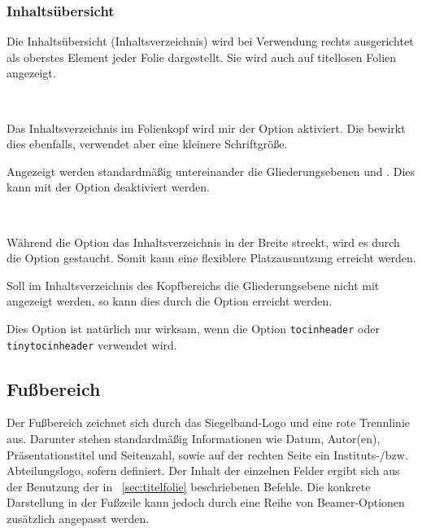 \subsubsection{Inhaltsübersicht}

Die Inhaltsübersicht (Inhaltsverzeichnis) wird bei Verwendung rechts
ausgerichtet als oberstes Element jeder Folie dargestellt.
Sie wird auch auf titellosen Folien angezeigt.


\begin{Declaration}
  \\
\end{Declaration}

Das Inhaltsverzeichnis im Folienkopf
wird mir der Option  aktiviert.
Die  bewirkt dies ebenfalls,
verwendet aber eine kleinere Schriftgröße.

Angezeigt werden standardmäßig untereinander die Gliederungsebenen
 und . Dies kann mit der Option
 deaktiviert werden.


\begin{Declaration}
  \\
\end{Declaration}

Während die Option  das Inhaltsverzeichnis in der Breite
streckt, wird es durch die Option  gestaucht.
Somit kann eine flexiblere Platzausnutzung erreicht werden.

\begin{Declaration}
\end{Declaration}

Soll im Inhaltsverzeichnis des Kopfbereichs die Gliederungsebene
 nicht mit angezeigt werden, so kann dies durch die Option
 erreicht werden.

Dies Option ist natürlich nur wirksam, wenn die Option
\lstinline{tocinheader} oder \lstinline{tinytocinheader} verwendet wird.



\subsection{Fußbereich}\label{subsec:foot}

Der Fußbereich zeichnet sich durch das Siegelband-Logo und eine rote Trennlinie
aus. Darunter stehen standardmäßig Informationen wie Datum, Autor(en), Präsentationstitel
und Seitenzahl, sowie auf der rechten Seite ein Instituts-/bzw. Abteilungslogo,
sofern definiert.
Der Inhalt der einzelnen Felder ergibt sich aus der Benutzung der in
\chaptername~\ref{sec:titelfolie} beschriebenen Befehle.
Die konkrete Darstellung in der Fußzeile kann jedoch durch eine Reihe von
Beamer-Optionen zusätzlich angepasst werden.

